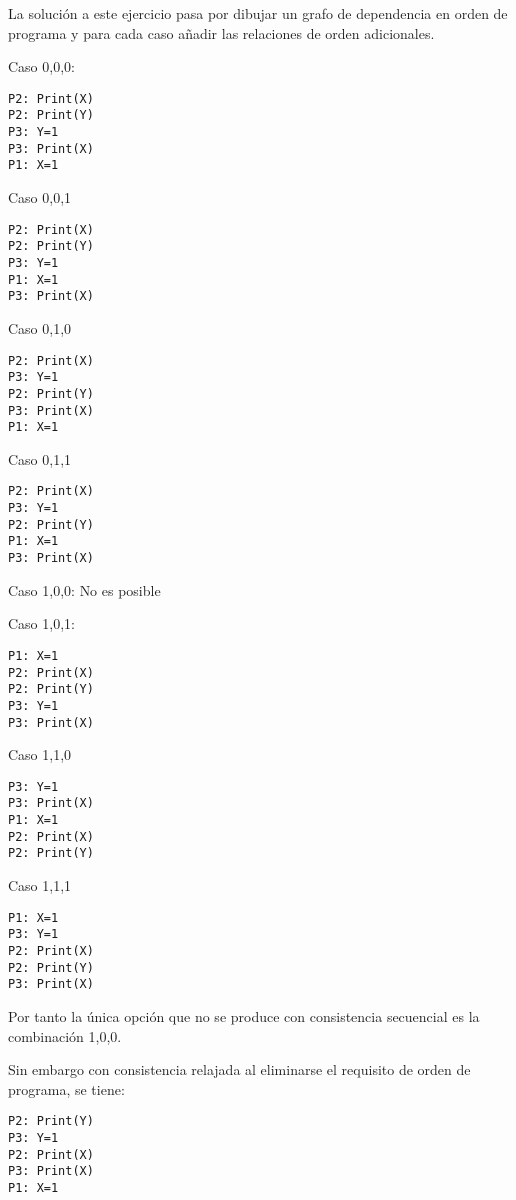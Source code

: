 \begin{acsolution}\end{acsolution}


La solución a este ejercicio pasa por dibujar un grafo de dependencia en orden
de programa y para cada caso añadir las relaciones de orden adicionales.

Caso 0,0,0:

\begin{lstlisting}
P2: Print(X)
P2: Print(Y)
P3: Y=1
P3: Print(X)
P1: X=1
\end{lstlisting}

Caso 0,0,1

\begin{lstlisting}
P2: Print(X)
P2: Print(Y)
P3: Y=1
P1: X=1
P3: Print(X)
\end{lstlisting}

Caso 0,1,0

\begin{lstlisting}
P2: Print(X)
P3: Y=1
P2: Print(Y)
P3: Print(X)
P1: X=1
\end{lstlisting}

Caso 0,1,1

\begin{lstlisting}
P2: Print(X)
P3: Y=1
P2: Print(Y)
P1: X=1
P3: Print(X)
\end{lstlisting}

Caso 1,0,0: {\color{red}No es posible}

Caso 1,0,1:

\begin{lstlisting}
P1: X=1
P2: Print(X)
P2: Print(Y)
P3: Y=1
P3: Print(X)
\end{lstlisting}

Caso 1,1,0

\begin{lstlisting}
P3: Y=1
P3: Print(X)
P1: X=1
P2: Print(X)
P2: Print(Y)
\end{lstlisting}

Caso 1,1,1

\begin{lstlisting}
P1: X=1
P3: Y=1
P2: Print(X)
P2: Print(Y)
P3: Print(X)
\end{lstlisting}

Por tanto la única opción que no se produce con consistencia secuencial es la combinación 1,0,0.

Sin embargo con consistencia relajada al eliminarse el requisito de orden de programa, se tiene:

\begin{lstlisting}
P2: Print(Y)
P3: Y=1
P2: Print(X)
P3: Print(X)
P1: X=1
\end{lstlisting}

